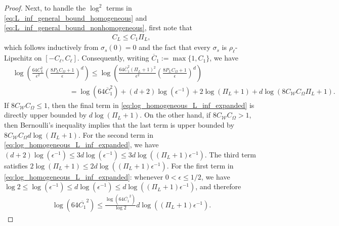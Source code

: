 \documentclass{article}
\def\cW{{\mathcal{W}}}
\begin{document}
\begin{appendices}
\begin{proof}
    Next, to handle the $\log^2$ terms in \eqref{eq:L_inf_general_bound_homogeneous} and \eqref{eq:L_inf_general_bound_nonhomogeneous}, first note that
    \begin{align}
        C_L \leq C_1 \Pi_L,
    \end{align}
    which follows inductively from $\sigma_s(0)=0$ and the fact that every $\sigma_s$ is $\rho_\ell$-Lipschitz on $[-C_\ell,C_\ell]$. Consequently, writing $\overline{C}_1 := \max\{1,C_1\}$, we have
    \begin{align} 
        &\log \left( \frac{64 C_L^2}{\epsilon^2} \left( \frac{8 P_L C_{\Omega} + 1}{\epsilon} \right)^d \right) \leq \log \left( \frac{64 \overline{C}_1^2 (\Pi_L + 1)^2}{\epsilon^2} \left( \frac{8 P_L C_{\Omega} + 1}{\epsilon} \right)^d \right) \\
        &\qquad \qquad \qquad \qquad = \log(64 \overline{C}_1^2) + (d+2) \log(\epsilon^{-1}) + 2 \log(\Pi_L+1) + d \log( 8  C_{\cW} C_\Omega \Pi_L + 1).  \label{eq:log_homogeneous_L_inf_expanded}
    \end{align}
    If $8 C_{\cW} C_\Omega \leq 1$, then the final term in \eqref{eq:log_homogeneous_L_inf_expanded} is directly upper bounded by $d \log (\Pi_L + 1)$. On the other hand, if $8 C_{\cW} C_\Omega > 1$, then Bernoulli's inequality implies that the last term is upper bounded by $8 C_{\cW} C_\Omega d \log(\Pi_L + 1)$. For the second term in \eqref{eq:log_homogeneous_L_inf_expanded}, we have $(d+2) \log(\epsilon^{-1}) \leq 3d \log(\epsilon^{-1}) \leq 3d \log((\Pi_L + 1) \epsilon^{-1})$. The third term satisfies $2 \log(\Pi_L+1) \leq 2d \log((\Pi_L+1)\epsilon^{-1})$. For the first term in \eqref{eq:log_homogeneous_L_inf_expanded}: whenever $0 < \epsilon \leq 1/2$, we have $\log 2 \leq \log (\epsilon^{-1}) \leq d \log(\epsilon^{-1}) \leq d \log((\Pi_L+1) \epsilon^{-1})$, and therefore
    \begin{align}
        \log (64 \overline{C_1}^2) \leq \frac{\log (64 \overline{C_1}^2)}{\log 2} d \log((\Pi_L+1) \epsilon^{-1}).
    \end{align}
    

\end{proof}
\end{appendices}
\end{document}

